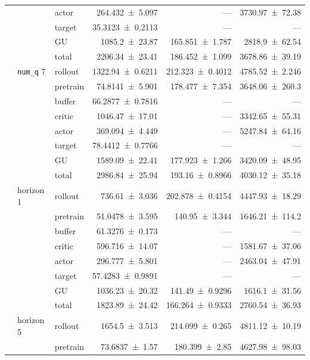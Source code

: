 {\begin{longtable}{@{}lllrrr@{}}
     &  & actor & \num{264.432+-5.097} & --- & \num{3730.97+-72.38} \\
     &  & target & \num{35.3123+-0.2113} & --- & --- \\
     &  & GU & \num{1085.2+-23.87} & \num{165.851+-1.787} & \num{2818.9+-62.54} \\
     &  & total & \num{2206.34+-23.41} & \num{186.452+-1.099} & \num{3678.86+-39.19} \\
    \addlinespace[2pt]
     & \texttt{num\_\allowbreak q} 7 & rollout & \num{1322.94+-0.6211} & \num{212.323+-0.4012} & \num{4785.52+-2.246} \\
     &  & pretrain & \num{74.8141+-5.901} & \num{178.477+-7.354} & \num{3648.06+-260.3} \\
     &  & buffer & \num{66.2877+-0.7816} & --- & --- \\
     &  & critic & \num{1046.47+-17.01} & --- & \num{3342.65+-55.31} \\
     &  & actor & \num{369.094+-4.449} & --- & \num{5247.84+-64.16} \\
     &  & target & \num{78.4412+-0.7766} & --- & --- \\
     &  & GU & \num{1589.09+-22.41} & \num{177.923+-1.266} & \num{3420.09+-48.95} \\
     &  & total & \num{2986.84+-25.94} & \num{193.16+-0.8966} & \num{4030.12+-35.18} \\
    \addlinespace[2pt]
     & horizon 1 & rollout & \num{736.61+-3.036} & \num{202.878+-0.4154} & \num{4447.93+-18.29} \\
     &  & pretrain & \num{51.0478+-3.595} & \num{140.95+-3.344} & \num{1646.21+-114.2} \\
     &  & buffer & \num{61.3276+-0.173} & --- & --- \\
     &  & critic & \num{596.716+-14.07} & --- & \num{1581.67+-37.06} \\
     &  & actor & \num{296.777+-5.801} & --- & \num{2463.04+-47.91} \\
     &  & target & \num{57.4283+-0.9891} & --- & --- \\
     &  & GU & \num{1036.23+-20.32} & \num{141.49+-0.9296} & \num{1616.1+-31.56} \\
     &  & total & \num{1823.89+-24.42} & \num{166.264+-0.9333} & \num{2760.54+-36.93} \\
    \addlinespace[2pt]
     & horizon 5 & rollout & \num{1654.5+-3.513} & \num{214.099+-0.265} & \num{4811.12+-10.19} \\
     &  & pretrain & \num{73.6837+-1.57} & \num{180.399+-2.85} & \num{4627.98+-98.03} \\

\end{longtable}}
